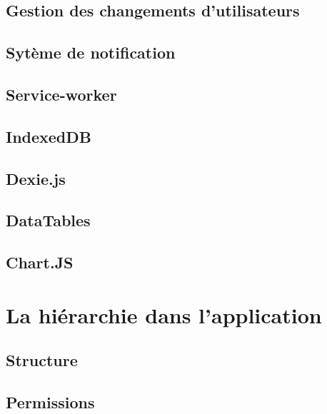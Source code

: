 \documentclass{EPL-master-thesis-covers-FR}
\begin{document}
			
			\subsection{Gestion des changements d'utilisateurs}		
			
			
			\subsection{Sytème de notification}	
						

			\subsection*{Service-worker}

		
			\subsection*{IndexedDB}

					

			\subsection*{Dexie.js}
				

			\subsection*{DataTables}

			

			\subsection*{Chart.JS}
				
				

		\section{La hiérarchie dans l'application}


			\subsection*{Structure}

			

			\subsection*{Permissions}
\end{document}
